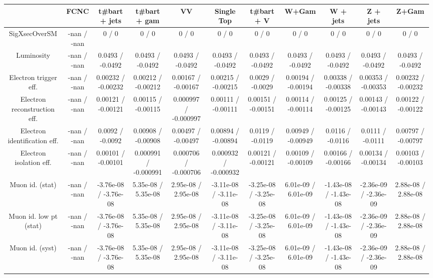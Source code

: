 \begin{table}[htbp]
\begin{center}
\footnotesize
\begin{tabular}{|c|c|c|c|c|c|c|c|c|c|c|}
\hline 
      & FCNC      & t#bar{t} + jets      & t#bar{t} +  gam      & VV      & Single Top      & t#bar{t} + V      & W+Gam      & W + jets      & Z + jets      & Z+Gam \\ 
\hline 
 SigXsecOverSM & -nan / -nan & 0 / 0 & 0 / 0 & 0 / 0 & 0 / 0 & 0 / 0 & 0 / 0 & 0 / 0 & 0 / 0 & 0 / 0 \\ 
  Luminosity & -nan / -nan & 0.0493 / -0.0492 & 0.0493 / -0.0492 & 0.0493 / -0.0492 & 0.0493 / -0.0492 & 0.0493 / -0.0492 & 0.0493 / -0.0492 & 0.0493 / -0.0492 & 0.0493 / -0.0492 & 0.0493 / -0.0492 \\ 
  Electron trigger eff. & -nan / -nan & 0.00232 / -0.00232 & 0.00212 / -0.00212 & 0.00167 / -0.00167 & 0.00215 / -0.00215 & 0.0029 / -0.0029 & 0.00194 / -0.00194 & 0.00338 / -0.00338 & 0.00353 / -0.00353 & 0.00232 / -0.00232 \\ 
  Electron reconstruction eff. & -nan / -nan & 0.00121 / -0.00121 & 0.00115 / -0.00115 & 0.000997 / -0.000997 & 0.00111 / -0.00111 & 0.00151 / -0.00151 & 0.00114 / -0.00114 & 0.00125 / -0.00125 & 0.00143 / -0.00143 & 0.00122 / -0.00122 \\ 
  Electron identification eff. & -nan / -nan & 0.0092 / -0.0092 & 0.00908 / -0.00908 & 0.00497 / -0.00497 & 0.00894 / -0.00894 & 0.0119 / -0.0119 & 0.00949 / -0.00949 & 0.0116 / -0.0116 & 0.0111 / -0.0111 & 0.00797 / -0.00797 \\ 
  Electron isolation eff. & -nan / -nan & 0.00101 / -0.00101 & 0.000991 / -0.000991 & 0.000706 / -0.000706 & 0.000932 / -0.000932 & 0.00121 / -0.00121 & 0.00109 / -0.00109 & 0.00166 / -0.00166 & 0.00134 / -0.00134 & 0.00103 / -0.00103 \\ 
  Muon id. (stat) & -nan / -nan & -3.76e-08 / -3.76e-08 & 5.35e-08 / 5.35e-08 & 2.95e-08 / 2.95e-08 & -3.11e-08 / -3.11e-08 & -3.25e-08 / -3.25e-08 & 6.01e-09 / 6.01e-09 & -1.43e-08 / -1.43e-08 & -2.36e-09 / -2.36e-09 & 2.88e-08 / 2.88e-08 \\ 
  Muon id. low pt (stat) & -nan / -nan & -3.76e-08 / -3.76e-08 & 5.35e-08 / 5.35e-08 & 2.95e-08 / 2.95e-08 & -3.11e-08 / -3.11e-08 & -3.25e-08 / -3.25e-08 & 6.01e-09 / 6.01e-09 & -1.43e-08 / -1.43e-08 & -2.36e-09 / -2.36e-09 & 2.88e-08 / 2.88e-08 \\ 
  Muon id. (syst) & -nan / -nan & -3.76e-08 / -3.76e-08 & 5.35e-08 / 5.35e-08 & 2.95e-08 / 2.95e-08 & -3.11e-08 / -3.11e-08 & -3.25e-08 / -3.25e-08 & 6.01e-09 / 6.01e-09 & -1.43e-08 / -1.43e-08 & -2.36e-09 / -2.36e-09 & 2.88e-08 / 2.88e-08 \\ 

\end{tabular}
\end{center}
\end{table}
